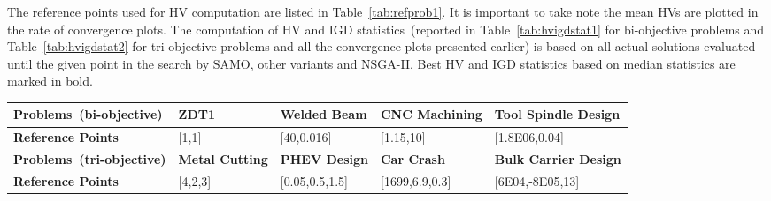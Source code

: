 The reference points used for HV computation are listed in Table~\ref{tab:refprob1}. It is important to take note the mean HVs are plotted in the rate of convergence plots. The computation of HV and IGD statistics~(reported in Table~\ref{tab:hvigdstat1} for bi-objective problems and Table~\ref{tab:hvigdstat2} for tri-objective problems and all the convergence plots presented earlier) is based on all actual solutions evaluated until the given point in the search by SAMO, other variants and NSGA-II. Best HV and IGD statistics based on median statistics are marked in bold.

\begin{table*}[!htb]\scriptsize
	\centering
	\caption{Reference points for Hypervolume computation}
	\begin{tabular}{|l|l|l|l|l|}
		\noalign{\smallskip}\hline
		\textbf{Problems~(bi-objective)}         & \textbf{ZDT1} & \textbf{Welded Beam} & \textbf{CNC Machining} & \textbf{Tool Spindle Design}\\ \hline
		\textbf{Reference Points} & {[}1,1{]}   & {[}40,0.016{]}   & {[}1.15,10{]}  & {[}1.8E06,0.04{]} \\ \hline
		\textbf{Problems~(tri-objective)}         & \textbf{Metal Cutting} & \textbf{PHEV Design}  & \textbf{Car Crash} & \textbf{Bulk Carrier Design}\\ \hline
		\textbf{Reference Points} & {[}4,2,3{]} & {[}0.05,0.5,1.5{]} & {[}1699,6.9,0.3{]} & {[}6E04,-8E05,13{]}\\ \hline
	\end{tabular}
	\label{tab:refprob1}
\end{table*}

